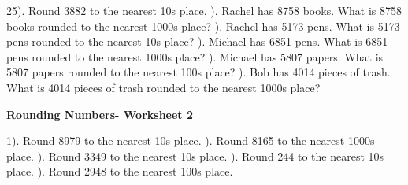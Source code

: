 \documentclass{article}%
\begin{document}
25). Round 3882 to the nearest 10s place.%
\newline%
\newline%
). Rachel has 8758 books. What is 8758 books rounded to the nearest 1000s place?%
\newline%
\newline%
). Rachel has 5173 pens. What is 5173 pens rounded to the nearest 10s place?%
\newline%
\newline%
). Michael has 6851 pens. What is 6851 pens rounded to the nearest 1000s place?%
\newline%
\newline%
). Michael has 5807 papers. What is 5807 papers rounded to the nearest 100s place?%
\newline%
\newline%
). Bob has 4014 pieces of trash. What is 4014 pieces of trash rounded to the nearest 1000s place?%
\newline%
\newline%
\newline%
\pagebreak%
\large%
\begin{center}%
\textbf{Rounding Numbers- Worksheet 2}%
\newline%
\newline%
\newline%
\end{center} \normalsize%
1). Round 8979 to the nearest 10s place.%
\newline%
\newline%
). Round 8165 to the nearest 1000s place.%
\newline%
\newline%
). Round 3349 to the nearest 10s place.%
\newline%
\newline%
). Round 244 to the nearest 10s place.%
\newline%
\newline%
). Round 2948 to the nearest 100s place.%
\newline%
\newline%
\end{document}
